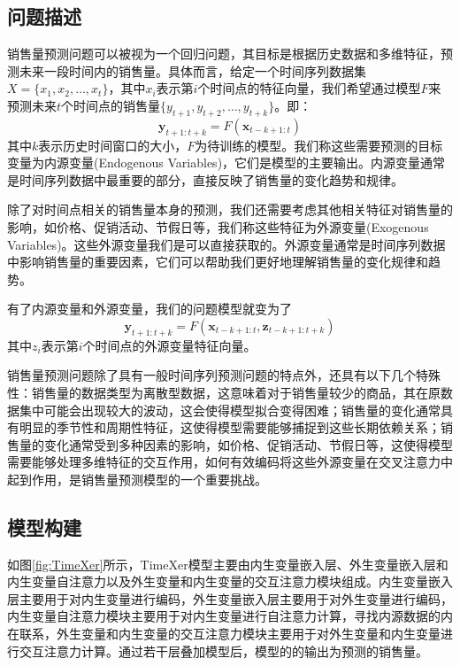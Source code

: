 \documentclass[12pt]{article}
\begin{document}
\subsection{问题描述}
销售量预测问题可以被视为一个回归问题，其目标是根据历史数据和多维特征，预测未来一段时间内的销售量。具体而言，给定一个时间序列数据集$X=\{x_1,x_2,\ldots,x_t\}$，其中$x_i$表示第$i$个时间点的特征向量，我们希望通过模型$F$来预测未来$t$个时间点的销售量$\{y_{t+1},y_{t+2},\ldots,y_{t+k}\}$。即：
\begin{equation}
    \mathbf{y}_{t+1:t+k} = F(\mathbf{x}_{t-k+1:t})
\end{equation}
其中$k$表示历史时间窗口的大小，$F$为待训练的模型。我们称这些需要预测的目标变量为内源变量(Endogenous Variables)，它们是模型的主要输出。内源变量通常是时间序列数据中最重要的部分，直接反映了销售量的变化趋势和规律。

除了对时间点相关的销售量本身的预测，我们还需要考虑其他相关特征对销售量的影响，如价格、促销活动、节假日等，我们称这些特征为外源变量(Exogenous Variables)。这些外源变量我们是可以直接获取的。外源变量通常是时间序列数据中影响销售量的重要因素，它们可以帮助我们更好地理解销售量的变化规律和趋势。

有了内源变量和外源变量，我们的问题模型就变为了
\begin{equation}
    \mathbf{y}_{t+1:t+k} = F(\mathbf{x}_{t-k+1:t}, \mathbf{z}_{t-k+1:t+k})
\end{equation}
其中$z_i$表示第$i$个时间点的外源变量特征向量。

销售量预测问题除了具有一般时间序列预测问题的特点外，还具有以下几个特殊性：销售量的数据类型为离散型数据，这意味着对于销售量较少的商品，其在原数据集中可能会出现较大的波动，这会使得模型拟合变得困难；销售量的变化通常具有明显的季节性和周期性特征，这使得模型需要能够捕捉到这些长期依赖关系；销售量的变化通常受到多种因素的影响，如价格、促销活动、节假日等，这使得模型需要能够处理多维特征的交互作用，如何有效编码将这些外源变量在交叉注意力中起到作用，是销售量预测模型的一个重要挑战。

\subsection{模型构建}
如图\ref{fig:TimeXer}所示，TimeXer模型主要由内生变量嵌入层、外生变量嵌入层和内生变量自注意力以及外生变量和内生变量的交互注意力模块组成。内生变量嵌入层主要用于对内生变量进行编码，外生变量嵌入层主要用于对外生变量进行编码，内生变量自注意力模块主要用于对内生变量进行自注意力计算，寻找内源数据的内在联系，外生变量和内生变量的交互注意力模块主要用于对外生变量和内生变量进行交互注意力计算。通过若干层叠加模型后，模型的的输出为预测的销售量。
\end{document}
